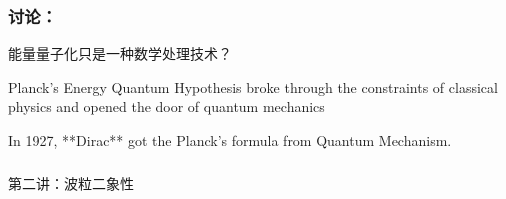 \begin{frame}
    \frametitle{讨论：}
    \begin{center}
        能量量子化只是一种数学处理技术？ 
    \end{center}
\end{frame}

\begin{frame}
    \begin{tcolorbox}[colback=yellow!10,colframe=red!75!black,title=Revolutionary Significance]
        Planck's Energy Quantum Hypothesis broke through the constraints of classical physics and 
        opened the door of quantum mechanics 
    \end{tcolorbox}
\end{frame}

\begin{frame}
    \begin{tcolorbox}[colback=yellow!10,colframe=red!75!black,title=THE END]
        In 1927, **Dirac** got the Planck's formula from Quantum Mechanism.
    \end{tcolorbox}
\end{frame}


\begin{frame}
    \frametitle{}
    \begin{center}
    { {\huge 第二讲：波粒二象性}}
    \end{center}    
\end{frame}

